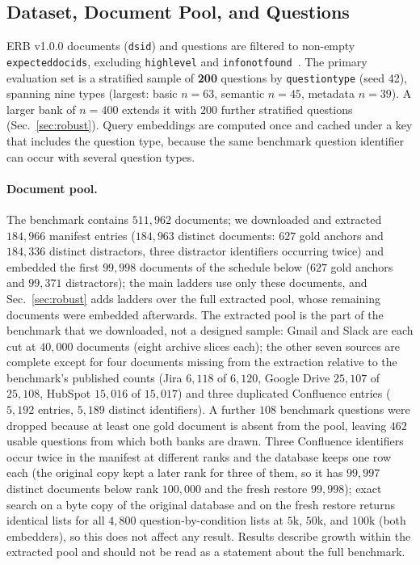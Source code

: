 \documentclass{ieeeaccess}
\makeatletter
\DeclareRobustCommand{\_}{\ifmmode\nfss@text{\textunderscore}\else\textunderscore\allowbreak\fi}
\makeatother
\begin{document}
\subsection{Dataset, Document Pool, and Questions}
\label{sec:pool}
ERB v1.0.0 documents (\texttt{dsid\_*}) and questions are filtered to non-empty \texttt{expected\_doc\_ids}, excluding \texttt{high\_level} and \texttt{info\_not\_found}~\cite{sun2026erb}. The primary evaluation set is a stratified sample of \textbf{200} questions by \texttt{question\_type} (seed 42), spanning nine types (largest: basic $n{=}63$, semantic $n{=}45$, metadata $n{=}39$). A larger bank of $n{=}400$ extends it with $200$ further stratified questions (Sec.~\ref{sec:robust}). Query embeddings are computed once and cached under a key that includes the question type, because the same benchmark question identifier can occur with several question types.

\paragraph{Document pool.}
The benchmark contains $511{,}962$ documents; we downloaded and extracted $184{,}966$ manifest entries ($184{,}963$ distinct documents: $627$ gold anchors and $184{,}336$ distinct distractors, three distractor identifiers occurring twice) and embedded the first $99{,}998$ documents of the schedule below ($627$ gold anchors and $99{,}371$ distractors); the main ladders use only these documents, and Sec.~\ref{sec:robust} adds ladders over the full extracted pool, whose remaining documents were embedded afterwards. The extracted pool is the part of the benchmark that we downloaded, not a designed sample: Gmail and Slack are each cut at $40{,}000$ documents (eight archive slices each); the other seven sources are complete except for four documents missing from the extraction relative to the benchmark's published counts (Jira $6{,}118$ of $6{,}120$, Google Drive $25{,}107$ of $25{,}108$, HubSpot $15{,}016$ of $15{,}017$) and three duplicated Confluence entries ($5{,}192$ entries, $5{,}189$ distinct identifiers). A further $108$ benchmark questions were dropped because at least one gold document is absent from the pool, leaving $462$ usable questions from which both banks are drawn. Three Confluence identifiers occur twice in the manifest at different ranks and the database keeps one row each (the original copy kept a later rank for three of them, so it has $99{,}997$ distinct documents below rank $100{,}000$ and the fresh restore $99{,}998$); exact search on a byte copy of the original database and on the fresh restore returns identical lists for all $4{,}800$ question-by-condition lists at $5\text{k}$, $50\text{k}$, and $100\text{k}$ (both embedders), so this does not affect any result. Results describe growth within the extracted pool and should not be read as a statement about the full benchmark.
\end{document}
